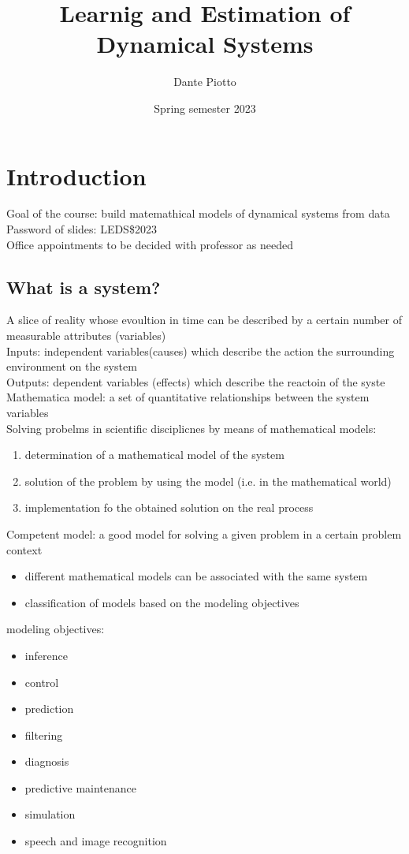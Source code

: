\documentclass{book}
\title{Learnig and Estimation of Dynamical Systems}
\author{Dante Piotto}
\date{Spring semester 2023}
\begin{document}
\maketitle

\tableofcontents

\chapter{Introduction}
Goal of the course: build matemathical models of dynamical systems from data\\
Password of slides: LEDS\$2023\\
Office appointments to be decided with professor as needed\\
\section{What is a system?}
A slice of reality whose evoultion in time can be described by a certain number of measurable attributes (variables)\\
Inputs: independent variables(causes) which describe the action the surrounding environment on the system\\
Outputs: dependent variables (effects) which describe the reactoin of the syste\\
Mathematica model: a set of quantitative relationships between the system variables\\
Solving probelms in scientific disciplicnes by means of mathematical models:
\begin{enumerate}
    \item determination of a mathematical model of the system
    \item solution of the problem by using the model (i.e. in the mathematical world)
    \item implementation fo the obtained solution on the real process
\end{enumerate}
Competent model: a good model for solving a given problem in a certain problem context
\begin{itemize}
    \item different mathematical models can be associated with the same system
    \item classification of models based on  the modeling objectives
\end{itemize}
modeling objectives:
\begin{itemize}
    \item inference
    \item control
    \item prediction
    \item filtering
    \item diagnosis
    \item predictive maintenance
    \item simulation
    \item speech and image recognition
\end{itemize}
\end{document}
